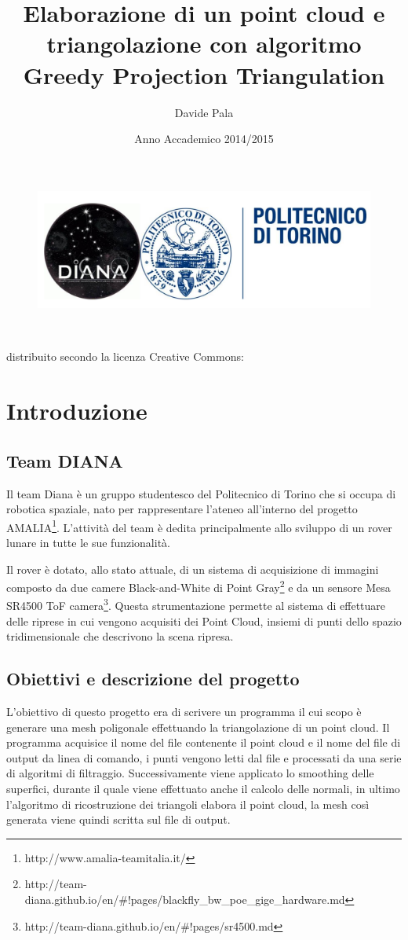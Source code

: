 \documentclass[a4paper,12pt]{article}
\title{Elaborazione di un point cloud e triangolazione con algoritmo Greedy Projection Triangulation}
\author{Davide Pala}
\date{Anno Accademico 2014/2015}
\begin{document}
\maketitle
\begin{figure}[H]
\centering
\includegraphics[width=13cm]{pics/logo_diana.jpg}
\end{figure}
\
\
\
\begin{center}
\small{distribuito secondo la licenza Creative Commons: \ccbyncsa}
\end{center}

\clearpage
\tableofcontents
\clearpage
\section{Introduzione}
	\subsection{Team DIANA}
	Il team Diana è un gruppo studentesco del Politecnico di Torino che si occupa di
	robotica spaziale, nato per rappresentare l'ateneo all'interno del progetto 
	AMALIA\footnote{http://www.amalia-teamitalia.it/}. 
	L'attività del team è dedita principalmente allo sviluppo di un rover lunare 
	in tutte le sue funzionalità.
	
	Il rover è dotato, allo stato attuale, di un sistema di acquisizione di immagini 
	composto da due camere Black-and-White di Point 
	Gray\footnote{http://team-diana.github.io/en/\#!pages/blackfly\_bw\_poe\_gige\_hardware.md} 
	e da un sensore Mesa SR4500 ToF	camera\footnote{http://team-diana.github.io/en/\#!pages/sr4500.md}.
	Questa strumentazione permette al sistema di effettuare delle riprese in cui vengono acquisiti dei 
	Point Cloud, insiemi di punti dello spazio tridimensionale che descrivono la scena ripresa.
	
	\subsection{Obiettivi e descrizione del progetto}
	L'obiettivo di questo progetto era di scrivere un programma il cui scopo è generare una mesh poligonale effettuando la
	triangolazione di un point cloud. 
  Il programma acquisice il nome del file contenente il point cloud e il nome del file di output da linea di comando,
	i punti vengono letti dal file e processati da una serie di algoritmi di filtraggio. 
	Successivamente viene applicato lo smoothing delle superfici, durante il quale viene effettuato anche il calcolo delle
	normali, in ultimo l'algoritmo di ricostruzione dei triangoli elabora il point cloud, la mesh così generata viene quindi
	scritta sul file di output.  
	
\end{document}
